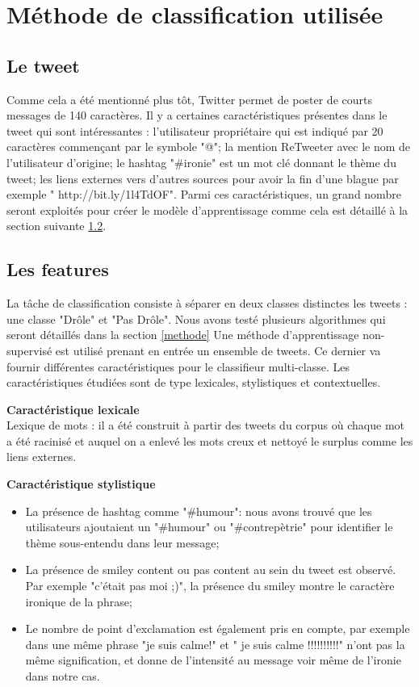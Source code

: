 \documentclass[10pt,a4paper,twoside]{article}
\begin{document}
\section{Méthode de classification utilisée}

\subsection{Le tweet} 
Comme cela a été mentionné plus tôt, Twitter permet de poster de courts messages de 140 caractères. Il y a certaines caractéristiques présentes dans le tweet qui sont intéressantes : l'utilisateur propriétaire qui est indiqué par 20 caractères commençant par le symbole "@"; la mention ReTweeter avec le nom de l'utilisateur d'origine; le hashtag "\#ironie" est un mot clé donnant le thème du tweet; les liens externes vers d'autres sources pour avoir la fin d'une blague par exemple " http://bit.ly/1l4TdOF". Parmi ces caractéristiques, un grand nombre seront exploités pour créer le modèle d'apprentissage comme cela est détaillé à la section suivante \ref{features}.




\subsection{Les features}
\label{features}
La tâche de classification consiste à séparer en deux classes distinctes les tweets : une classe "Drôle" et "Pas Drôle". Nous avons testé plusieurs algorithmes qui seront détaillés dans la section \ref{methode}
Une méthode d'apprentissage non-supervisé est utilisé prenant en entrée un ensemble de tweets. Ce dernier va fournir différentes caractéristiques pour le classifieur multi-classe. Les caractéristiques étudiées sont de type lexicales, stylistiques et contextuelles. 

\textbf{Caractéristique lexicale}\\
Lexique de mots : il a été construit à partir des tweets du corpus où chaque mot a été racinisé et auquel on a enlevé les mots creux et nettoyé le surplus comme les liens externes.
\vspace{0.5cm}

\textbf{Caractéristique stylistique}
\begin{itemize}
\item La présence de hashtag comme "\#humour": nous avons trouvé que les utilisateurs ajoutaient un "\#humour" ou "\#contrepètrie" pour identifier le thème sous-entendu dans leur message;
\item La présence de smiley content ou pas content au sein du tweet est observé. Par exemple "c'était pas moi ;)", la présence du smiley montre le caractère ironique de la phrase;
\item Le nombre de point d'exclamation est également pris en compte, par exemple dans une même phrase "je suis calme!" et " je suis calme !!!!!!!!!!" n'ont pas la même signification, et donne de l'intensité au message voir même de l'ironie dans notre cas. 
\end{itemize}
\vspace{0.5cm}
\end{document}
